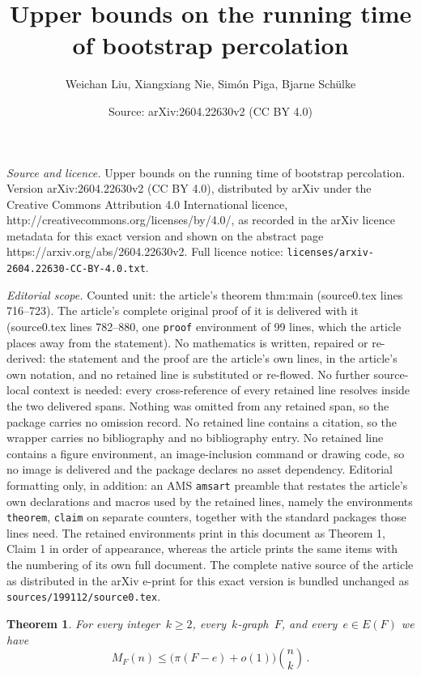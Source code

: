 \documentclass[10pt,a4paper]{amsart}
\title{Upper bounds on the running time of bootstrap percolation}
\author{Weichan Liu, Xiangxiang Nie, Sim\'on Piga, Bjarne Sch\"{u}lke}
\date{Source: arXiv:2604.22630v2 (CC BY 4.0)}
\newtheorem{theorem}{Theorem}
\begin{document}
\maketitle

\noindent\emph{Source and licence.} Upper bounds on the running time of bootstrap percolation. Version arXiv:2604.22630v2 (CC BY 4.0), distributed by arXiv under the Creative Commons Attribution 4.0 International licence, http://creativecommons.org/licenses/by/4.0/, as recorded in the arXiv licence metadata for this exact version and shown on the abstract page https://arxiv.org/abs/2604.22630v2. Full licence notice: \texttt{licenses/arxiv-2604.22630-CC-BY-4.0.txt}.\par\smallskip

\noindent\textit{Editorial scope.} Counted unit: the article's theorem thm:main (source0.tex lines 716--723). The article's complete original proof of it is delivered with it (source0.tex lines 782--880, one \texttt{proof} environment of 99 lines, which the article places away from the statement). No mathematics is written, repaired or re-derived: the statement and the proof are the article's own lines, in the article's own notation, and no retained line is substituted or re-flowed.  No further source-local context is needed: every cross-reference of every retained line resolves inside the two delivered spans.  Nothing was omitted from any retained span, so the package carries no omission record.  No retained line contains a citation, so the wrapper carries no bibliography and no bibliography entry.  No retained line contains a figure environment, an image-inclusion command or drawing code, so no image is delivered and the package declares no asset dependency.  Editorial formatting only, in addition: an AMS \texttt{amsart} preamble that restates the article's own declarations and macros used by the retained lines, namely the environments \texttt{theorem}, \texttt{claim} on separate counters, together with the standard packages those lines need.  The retained environments print in this document as Theorem 1, Claim 1 in order of appearance, whereas the article prints the same items with the numbering of its own full document.  The complete native source of the article as distributed in the arXiv e-print for this exact version is bundled unchanged as \texttt{sources/199112/source0.tex}.
    \begin{theorem}\label{thm:main}
        For every integer~$k\geq2$, every~$k$-graph~$F$, and every~$e\in E(F)$ we have 
        \begin{equation*}
         M_F(n)
         \leq
         \big(\pi(F-e)+o(1)\big)\binom{n}{k}\,.
        \end{equation*}
    \end{theorem}
\end{document}
